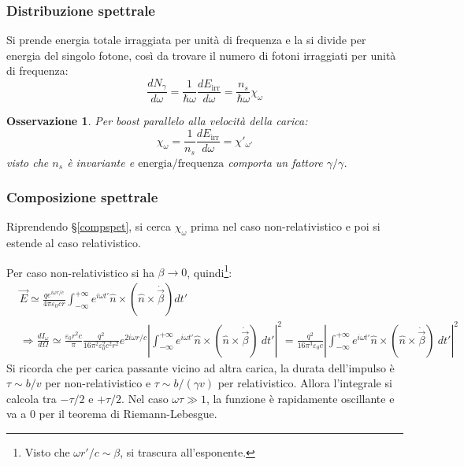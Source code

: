 \documentclass[10pt, a4paper]{scrartcl}
\numberwithin{equation}{subsection}
\theoremstyle{style1}
\newtheorem{osservazione}{Osservazione}[section]
\begin{document}
\subsubsection{Distribuzione spettrale}
Si prende energia totale irraggiata per unit\`a di frequenza e la si divide per energia del singolo fotone, cos\`i da trovare il numero di fotoni irraggiati per unit\`a di frequenza:
\begin{equation}
\frac{d N_\gamma}{d \omega} = \frac{1}{\hbar  \omega} \frac{d E_\text{irr}}{d \omega} = \frac{n_s}{\hbar  \omega} \chi _\omega
\end{equation}
\begin{osservazione}
Per boost parallelo alla velocit\`a della carica:
\begin{equation}
	\chi _\omega = \frac{1}{n_s} \frac{d E_\text{irr}}{d \omega}  = \chi '_{\omega'} 
\end{equation}
visto che $n_s$ \`e invariante e $\text{energia} / \text{frequenza}$ comporta un fattore $\gamma / \gamma$.
\end{osservazione}
\subsubsection{Composizione spettrale}

Riprendendo \S\ref{compspet}, si cerca $\chi _\omega$ prima nel caso non-relativistico e poi si estende al caso relativistico. 

Per caso non-relativistico si ha $\beta \to 0$, quindi\footnote{Visto che $\omega r' / c \sim \beta $, si trascura all'esponente.}:
\[
	\begin{split}
&\vec{E}\simeq \frac{q e^{i\omega r / c} }{4\pi \varepsilon _0 c r}\int_{-\infty} ^{+\infty} e^{i\omega t'} \hat{n}\times (\hat{n}\times \dot{\vec{\beta }}) dt' \\
&\Rightarrow \frac{d I_\omega}{d \Omega }  \simeq \frac{\varepsilon _0 r^2 c}{\pi} \frac{q^2}{16 \pi ^2 \varepsilon _0^2c^2 r^2} e^{2i\omega r /c }  \left\lvert \int_{-\infty} ^{+\infty} e^{i\omega t' } \hat{n}\times (\hat{n}\times \dot{\vec{\beta }}) \ dt'  \right\rvert ^2 = \frac{q^2}{16 \pi^3 \varepsilon _0 c} \left\lvert \int_{-\infty} ^{+\infty} e^{i\omega t' } \hat{n}\times (\hat{n}\times \dot{\vec{\beta }}) \ dt' \right\rvert ^2
	\end{split}
\] 
Si ricorda che per carica passante vicino ad altra carica, la durata dell'impulso \`e $\tau  \sim b / v$ per non-relativistico e $\tau  \sim b / (\gamma v)$ per relativistico. Allora l'integrale si calcola tra $- \tau  / 2$ e $ + \tau  / 2$. Nel caso $\omega \tau  \gg 1 $, la funzione \`e rapidamente oscillante e va a $0$ per il teorema di Riemann-Lebesgue.
\end{document}
